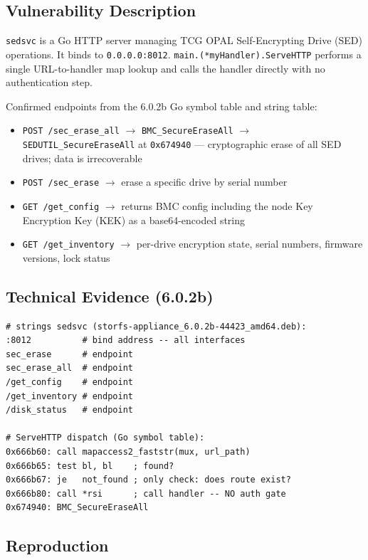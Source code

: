 \documentclass[11pt,a4paper]{article}
\begin{document}
\subsection*{Vulnerability Description}

\texttt{sedsvc} is a Go HTTP server managing TCG OPAL Self-Encrypting Drive
(SED) operations. It binds to \texttt{0.0.0.0:8012}.
\texttt{main.(*myHandler).ServeHTTP} performs a single URL-to-handler map
lookup and calls the handler directly with no authentication step.

Confirmed endpoints from the 6.0.2b Go symbol table and string table:

\begin{itemize}[noitemsep]
\item \texttt{POST /sec\_erase\_all} $\rightarrow$ \texttt{BMC\_SecureEraseAll}
  $\rightarrow$ \texttt{SEDUTIL\_SecureEraseAll} at \texttt{0x674940} ---
  cryptographic erase of all SED drives; data is irrecoverable
\item \texttt{POST /sec\_erase} $\rightarrow$ erase a specific drive by serial number
\item \texttt{GET /get\_config} $\rightarrow$ returns BMC config including the node
  Key Encryption Key (KEK) as a base64-encoded string
\item \texttt{GET /get\_inventory} $\rightarrow$ per-drive encryption state, serial
  numbers, firmware versions, lock status
\end{itemize}

\subsection*{Technical Evidence (6.0.2b)}

\begin{lstlisting}
# strings sedsvc (storfs-appliance_6.0.2b-44423_amd64.deb):
:8012          # bind address -- all interfaces
sec_erase      # endpoint
sec_erase_all  # endpoint
/get_config    # endpoint
/get_inventory # endpoint
/disk_status   # endpoint

# ServeHTTP dispatch (Go symbol table):
0x666b60: call mapaccess2_faststr(mux, url_path)
0x666b65: test bl, bl    ; found?
0x666b67: je   not_found ; only check: does route exist?
0x666b80: call *rsi      ; call handler -- NO auth gate
0x674940: BMC_SecureEraseAll
\end{lstlisting}

\subsection*{Reproduction}
\end{document}
